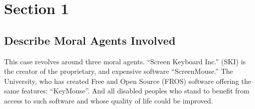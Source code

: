 \section{Section 1}
\subsection{Describe Moral Agents Involved}
This case revolves around three moral agents. ``Screen Keyboard Inc.'' (SKI) is the creator of the proprietary, and expensive software ``ScreenMouse.'' The University, who has created Free and Open Source (FROS) software offering the same features: ``KeyMouse''. And all disabled peoples who stand to benefit from access to such software and whose quality of life could be improved.
